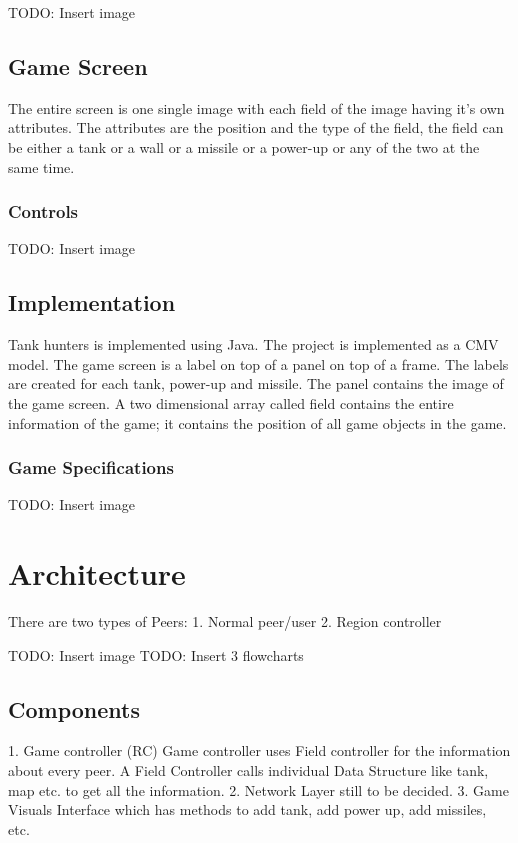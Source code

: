 \documentclass[paper=a4, fontsize=11pt]{scrartcl}
\numberwithin{equation}{section}
\numberwithin{figure}{section}
\numberwithin{table}{section}
\begin{document}
TODO: Insert image

\subsection{Game Screen}
The entire screen is one single image with each field of the image having it’s own attributes. The attributes are the position and the type of the field, the field can be either a tank or a wall or a missile or a power-up or any of the two at the same time.

\subsubsection{Controls}
TODO: Insert image

\subsection{Implementation}
Tank hunters is implemented using Java. The project is implemented as a CMV model. The game screen is a label on top of a panel on top of a frame. The labels are created for each tank, power-up and missile. The panel contains the image of the game screen. A two dimensional array called field contains the entire information of the game; it contains the position of all game objects in the game.

\subsubsection{Game Specifications}
TODO: Insert image

\section{Architecture}
There are two types of Peers:
1. Normal peer/user
2. Region controller

 TODO: Insert image
TODO: Insert 3 flowcharts


\subsection{Components}

1. Game controller (RC)
Game controller uses Field controller for the information about every peer. A Field Controller
calls individual Data Structure like tank, map etc. to get all the information.
2. Network Layer
still to be decided.
3. Game Visuals
Interface which has methods to add tank, add power up, add missiles, etc.
\end{document}
